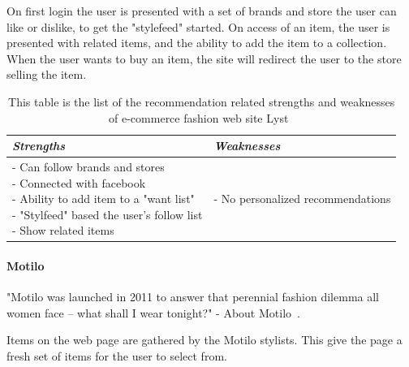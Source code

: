     On first login the user is presented with a set of brands and store the user can like or dislike, to get the "stylefeed" started.
    On access of an item, the user is presented with related items, and the ability to add the item to a collection.
    When the user wants to buy an item, the site will redirect the user to the store selling the item.
    \begin{table}[H]
        \centering
        \begin{tabular}{l|l}
            \toprule
            \emph{Strengths} & \emph{Weaknesses} \\ \hline
            \pbox{9cm}{
                - Can follow brands and stores \\
                - Connected with facebook \\
                - Ability to add item to a "want list" \\
                - "Stylfeed" based the user's follow list \\
                - Show related items
            } & \pbox{9cm}{
                - No personalized recommendations \\
            } \\ \bottomrule
        \end{tabular}
        \caption[Recommendation related strengths and weaknesses of Lyst~\cite{lyst}]{This table is the list of the recommendation related strengths and weaknesses of e-commerce fashion web site Lyst~\cite{lyst}}
        \label{table:ecommenreceLyst}
    \end{table}

\paragraph{Motilo} %
\label{par:motilo}
    "Motilo was launched in 2011 to answer that perennial fashion dilemma all women face – what shall I wear tonight?" - About Motilo~\cite{motilo}.

    Items on the web page are gathered by the Motilo stylists.
    This give the page a fresh set of items for the user to select from.

